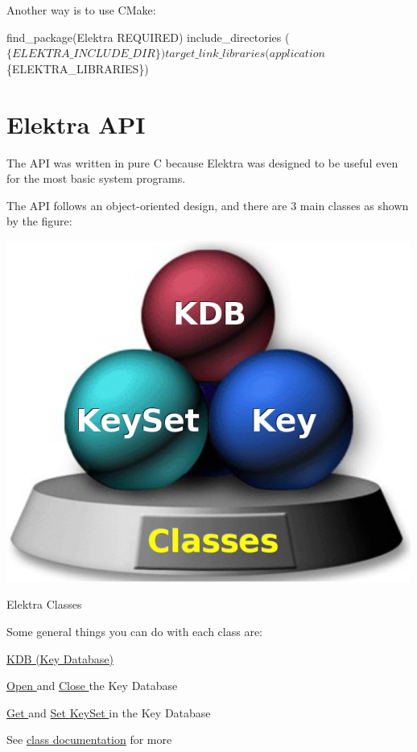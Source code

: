 Another way is to use C\-Make\-: 
\begin{DoxyCode}
find\_package(Elektra REQUIRED)
include\_directories ($\{ELEKTRA\_INCLUDE\_DIR\})
target\_link\_libraries (application $\{ELEKTRA\_LIBRARIES\})
\end{DoxyCode}
\hypertarget{index_classes}{}\section{Elektra A\-P\-I}\label{index_classes}
The A\-P\-I was written in pure C because Elektra was designed to be useful even for the most basic system programs.

The A\-P\-I follows an object-\/oriented design, and there are 3 main classes as shown by the figure\-:


\begin{DoxyImage}
\includegraphics{classes.png}
\caption{Elektra Classes}
\end{DoxyImage}
 Some general things you can do with each class are\-:

\hyperlink{group__kdb}{K\-D\-B (Key Database) }
\begin{DoxyItemize}
\item \hyperlink{group__kdb_ga6808defe5870f328dd17910aacbdc6ca}{Open } and \hyperlink{group__kdb_gadb54dc9fda17ee07deb9444df745c96f}{Close } the Key Database
\item \hyperlink{group__kdb_ga28e385fd9cb7ccfe0b2f1ed2f62453a1}{Get } and \hyperlink{group__kdb_ga11436b058408f83d303ca5e996832bcf}{Set } \hyperlink{group__keyset}{Key\-Set } in the Key Database
\item See \hyperlink{group__kdb}{class documentation} for more
\end{DoxyItemize}

